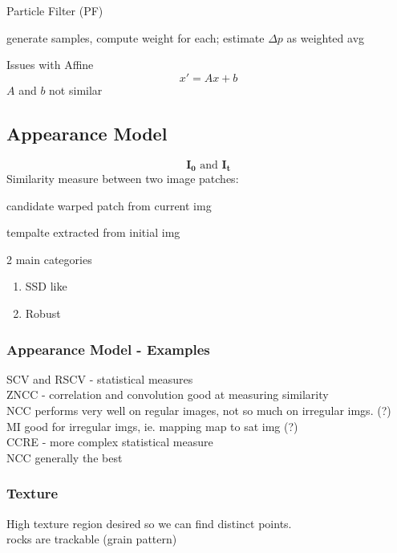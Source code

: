 \documentclass{article}
\begin{document}
Particle Filter (PF)
\begin{list}{}{}
    \item generate samples, compute weight for each; estimate $\Delta p$ as weighted avg
\end{list}
\begin{expln}
    {Issues with Affine}{}
    \[
        x' = Ax + b
    \]
    $A$ and $b$ not similar 
\end{expln}


\subsection{Appearance Model}
\[
    \mathbf{I_0} \text{ and } \mathbf{I_t}
\]
Similarity measure between two image patches:
\begin{list}{}{}
    \item candidate warped patch from current img
    \item tempalte extracted from initial img
\end{list}
2 main categories
\begin{enumerate}
    \item SSD like
    \item Robust
\end{enumerate}
\subsubsection{Appearance Model - Examples}
SCV and RSCV - statistical measures \\
ZNCC - correlation and convolution good at measuring similarity
\\
NCC performs very well on regular images, not so much on irregular imgs. (?)
\\
MI good for irregular imgs, ie. mapping map to sat img (?)
\\
CCRE - more complex statistical measure\\
NCC generally the best 

\subsubsection{Texture}
High texture region desired so we can find distinct points. \\[5pt]
rocks are trackable (grain pattern)
\end{document}
